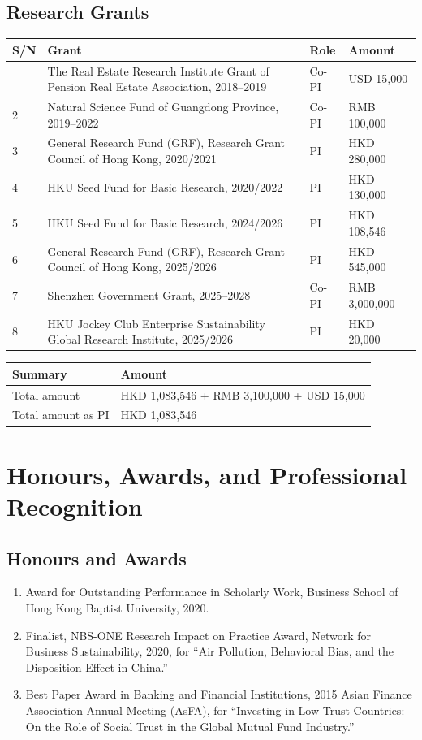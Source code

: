 \documentclass[11pt]{article}
\newcommand{\cvpub}[1]{\item #1}
\begin{document}
\subsection{Research Grants}
\begin{longtable}{@{}p{}p{}p{}p{}@{}}
\toprule
\textbf{S/N} & \textbf{Grant} & \textbf{Role} & \textbf{Amount} \\
\midrule
\endhead
\bottomrule
\endfoot
1 & The Real Estate Research Institute Grant of Pension Real Estate Association, 2018--2019 & Co-PI & USD 15,000 \\
2 & Natural Science Fund of Guangdong Province, 2019--2022 & Co-PI & RMB 100,000 \\
3 & General Research Fund (GRF), Research Grant Council of Hong Kong, 2020/2021 & PI & HKD 280,000 \\
4 & HKU Seed Fund for Basic Research, 2020/2022 & PI & HKD 130,000 \\
5 & HKU Seed Fund for Basic Research, 2024/2026 & PI & HKD 108,546 \\
6 & General Research Fund (GRF), Research Grant Council of Hong Kong, 2025/2026 & PI & HKD 545,000 \\
7 & Shenzhen Government Grant, 2025--2028 & Co-PI & RMB 3,000,000 \\
8 & HKU Jockey Club Enterprise Sustainability Global Research Institute, 2025/2026 & PI & HKD 20,000 \\
\end{longtable}

\begin{longtable}{@{}p{}p{}@{}}
\toprule
\textbf{Summary} & \textbf{Amount} \\
\midrule
\endhead
\bottomrule
\endfoot
Total amount & HKD 1,083,546 + RMB 3,100,000 + USD 15,000 \\
Total amount as PI & HKD 1,083,546 \\
\end{longtable}

\section{Honours, Awards, and Professional Recognition}
\subsection{Honours and Awards}
\begin{enumerate}
\cvpub{Award for Outstanding Performance in Scholarly Work, Business School of Hong Kong Baptist University, 2020.}
\cvpub{Finalist, NBS-ONE Research Impact on Practice Award, Network for Business Sustainability, 2020, for ``Air Pollution, Behavioral Bias, and the Disposition Effect in China.''}
\cvpub{Best Paper Award in Banking and Financial Institutions, 2015 Asian Finance Association Annual Meeting (AsFA), for ``Investing in Low-Trust Countries: On the Role of Social Trust in the Global Mutual Fund Industry.''}
\end{enumerate}
\end{document}
